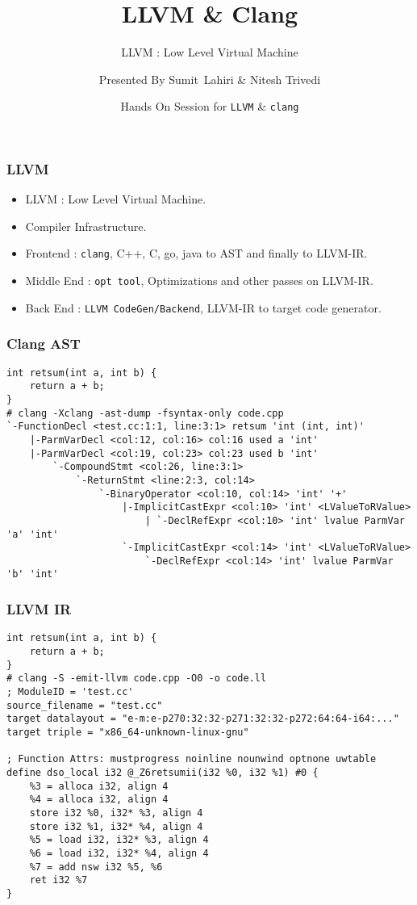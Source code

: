 \documentclass{beamer}
\title[\url{https://llvm.org/}] %
{LLVM \& Clang}
\subtitle{LLVM : Low Level Virtual Machine}
\author[LLVM \& Clang] %
{Presented By Sumit~Lahiri\inst{1} \& Nitesh Trivedi\inst{1}}
\institute[VFU] %
{
	\inst{1}%
	IIT Kanpur
}
\date[] %
{Hands On Session for \texttt{LLVM} \& \texttt{clang}}
\begin{document}
\frame{\titlepage}

\begin{frame}
	\frametitle{LLVM}
	\begin{itemize}
		\item LLVM : Low Level Virtual Machine. \pause
		\item Compiler Infrastructure. \pause
		\item Frontend : \texttt{clang}, C++, C, go, java to AST and finally to LLVM-IR. \pause
		\item Middle End : \texttt{opt tool}, Optimizations and other passes on LLVM-IR. \pause
		\item Back End : \texttt{LLVM CodeGen/Backend}, LLVM-IR to target code generator.  \pause
	\end{itemize}
\end{frame}

\begin{frame}[fragile]
	\frametitle{Clang AST}
	\begin{verbatim}
int retsum(int a, int b) {
	return a + b;
}
# clang -Xclang -ast-dump -fsyntax-only code.cpp
`-FunctionDecl <test.cc:1:1, line:3:1> retsum 'int (int, int)'
	|-ParmVarDecl <col:12, col:16> col:16 used a 'int'
	|-ParmVarDecl <col:19, col:23> col:23 used b 'int'
		`-CompoundStmt <col:26, line:3:1>
			`-ReturnStmt <line:2:3, col:14>
				`-BinaryOperator <col:10, col:14> 'int' '+'
					|-ImplicitCastExpr <col:10> 'int' <LValueToRValue>
						| `-DeclRefExpr <col:10> 'int' lvalue ParmVar 'a' 'int'
					`-ImplicitCastExpr <col:14> 'int' <LValueToRValue>
						`-DeclRefExpr <col:14> 'int' lvalue ParmVar 'b' 'int'
	\end{verbatim}
\end{frame}

\begin{frame}[fragile]
	\frametitle{LLVM IR}
	\begin{verbatim}
int retsum(int a, int b) {
	return a + b;
}
# clang -S -emit-llvm code.cpp -O0 -o code.ll
; ModuleID = 'test.cc'
source_filename = "test.cc"
target datalayout = "e-m:e-p270:32:32-p271:32:32-p272:64:64-i64:..."
target triple = "x86_64-unknown-linux-gnu"

; Function Attrs: mustprogress noinline nounwind optnone uwtable
define dso_local i32 @_Z6retsumii(i32 %0, i32 %1) #0 {
	%3 = alloca i32, align 4
	%4 = alloca i32, align 4
	store i32 %0, i32* %3, align 4
	store i32 %1, i32* %4, align 4
	%5 = load i32, i32* %3, align 4
	%6 = load i32, i32* %4, align 4
	%7 = add nsw i32 %5, %6
	ret i32 %7
}
	\end{verbatim}
\end{frame}
\end{document}
